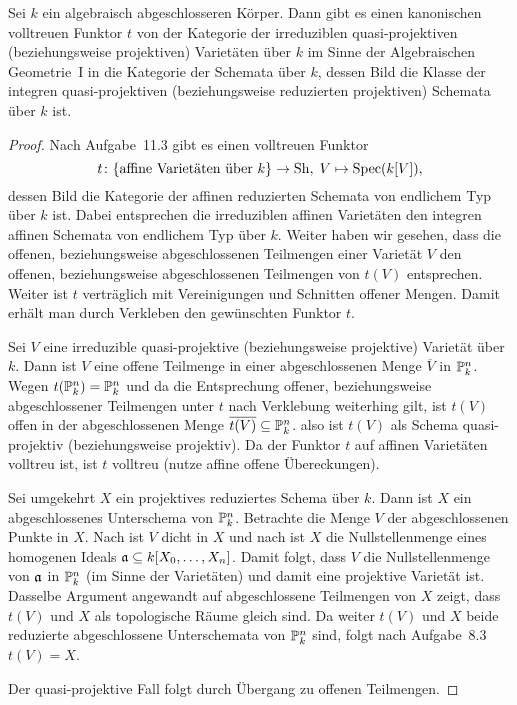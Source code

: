 \begin{thm}
\label{thm:11.22}
	Sei $k$ ein algebraisch abgeschlosseren Körper. Dann gibt es einen kanonischen volltreuen Funktor $t$ von der Kategorie der irreduziblen quasi-projektiven (beziehungsweise projektiven) Varietäten über $k$ im Sinne der Algebraischen Geometrie~I in die Kategorie der Schemata über $k$, dessen Bild die Klasse der integren quasi-projektiven (beziehungsweise reduzierten projektiven) Schemata über $k$ ist.
	\begin{proof}
		Nach Aufgabe~11.3 gibt es einen volltreuen Funktor
		\[
			t\colon \{\text{affine Varietäten über }k\} \to \Sh,\; V \mapsto \Spec(k[V]),
		\]
		dessen Bild die Kategorie der affinen reduzierten Schemata von endlichem Typ über $k$ ist. Dabei entsprechen die irreduziblen affinen Varietäten den integren affinen Schemata von endlichem Typ über $k$. Weiter haben wir gesehen, dass die offenen, beziehungsweise abgeschlossenen Teilmengen einer Varietät $V$ den offenen, beziehungsweise abgeschlossenen Teilmengen von $t(V)$ entsprechen. Weiter ist $t$ verträglich mit Vereinigungen und Schnitten offener Mengen. Damit erhält man durch Verkleben den gewünschten Funktor $t$.

		Sei $V$ eine irreduzible quasi-projektive (beziehungsweise projektive) Varietät über $k$. Dann ist $V$ eine offene Teilmenge in einer abgeschlossenen Menge $\overline{V}$ in $\P^n_k$. Wegen $t(\P^n_k) = \P^n_k$ und da die Entsprechung offener, beziehungsweise abgeschlossener Teilmengen unter $t$ nach Verklebung weiterhing gilt, ist $t(V)$ offen in der abgeschlossenen Menge $\overline{t(V)} \subseteq \P^n_k$. also ist $t(V)$ als Schema quasi-projektiv (beziehungsweise projektiv). Da der Funktor $t$ auf affinen Varietäten volltreu ist, ist $t$ volltreu (nutze affine offene Übereckungen).

		Sei umgekehrt $X$ ein projektives reduziertes Schema über $k$. Dann ist $X$ ein abgeschlossenes Unterschema von $\P^n_k$. Betrachte die Menge $V$ der abgeschlossenen Punkte in $X$. Nach \cite[Exercise~II.3.14]{hartshorne1977algebraic} ist $V$ dicht in $X$ und nach \cite[Corrolary~II.5.16]{hartshorne1977algebraic} ist $X$ die Nullstellenmenge eines homogenen Ideals $\mfa \subseteq k[X_0,\ldots,X_n]$. Damit folgt, dass $V$ die Nullstellenmenge von $\mfa$ in $\P^n_k$ (im Sinne der Varietäten) und damit eine projektive Varietät ist. Dasselbe Argument angewandt auf abgeschlossene Teilmengen von $X$ zeigt, dass $t(V)$ und $X$ als topologische Räume gleich sind. Da weiter $t(V)$ und $X$ beide reduzierte abgeschlossene Unterschemata von $\P^n_k$ sind, folgt nach Aufgabe~8.3 $t(V) = X$.

		Der quasi-projektive Fall folgt durch Übergang zu offenen Teilmengen.
	\end{proof}
\end{thm}

